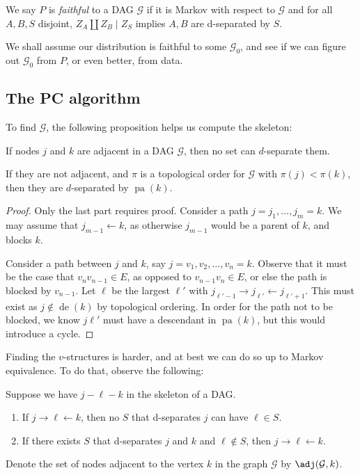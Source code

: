 \documentclass[a4paper]{article}
\DeclareMathOperator\pa{pa}
\DeclareMathOperator\de{de}
\begin{document}
\begin{defi}[Faithfulness]
  We say $P$ is \emph{faithful} to a DAG $\mathcal{G}$ if it is Markov with respect to $\mathcal{G}$ and for all $A, B, S$ disjoint, $Z_A \amalg Z_B \mid Z_S$ implies $A, B$ are d-separated by $S$.
\end{defi}

We shall assume our distribution is faithful to some $\mathcal{G}_0$, and see if we can figure out $\mathcal{G}_0$ from $P$, or even better, from data.

\subsection{The PC algorithm}
To find $\mathcal{G}$, the following proposition helps us compute the skeleton:
\begin{prop}
  If nodes $j$ and $k$ are adjacent in a DAG $\mathcal{G}$, then no set can $d$-separate them.

  If they are not adjacent, and $\pi$ is a topological order for $\mathcal{G}$ with $\pi(j) < \pi(k)$, then they are $d$-separated by $\pa(k)$.
\end{prop}

\begin{proof}
  Only the last part requires proof. Consider a path $j = j_1, \ldots, j_m = k$. We may assume that $j_{m - 1} \leftarrow k$, as otherwise $j_{m - 1}$ would be a parent of $k$, and blocks $k$.

  Consider a path between $j$ and $k$, say $j = v_1 , v_2, \ldots, v_n = k$. Observe that it must be the case that $v_n v_{n - 1} \in E$, as opposed to $v_{n - 1} v_n \in E$, or else the path is blocked by $v_{n - 1}$. Let $\ell$ be the largest $\ell'$ with $j_{\ell' - 1} \to j_{\ell'} \leftarrow j_{\ell' + 1}$. This must exist as $j \not\in \de(k)$ by topological ordering. In order for the path not to be blocked, we know $j\ell'$ must have a descendant in $\pa(k)$, but this would introduce a cycle.
\end{proof}

Finding the $v$-structures is harder, and at best we can do so up to Markov equivalence. To do that, observe the following:
\begin{prop}
  Suppose we have $j - \ell - k$ in the skeleton of a DAG.
  \begin{enumerate}
    \item If $j \to \ell \leftarrow k$, then no $S$ that d-separates $j$ can have $\ell \in S$.
    \item If there exists $S$ that d-separates $j$ and $k$ and $\ell \not \in S$, then $j \to \ell \leftarrow k$.\qedsym
  \end{enumerate}
\end{prop}
Denote the set of nodes adjacent to the vertex $k$ in the graph $\mathcal{G}$ by $\adj(\mathcal{G}, k)$.
\end{document}
